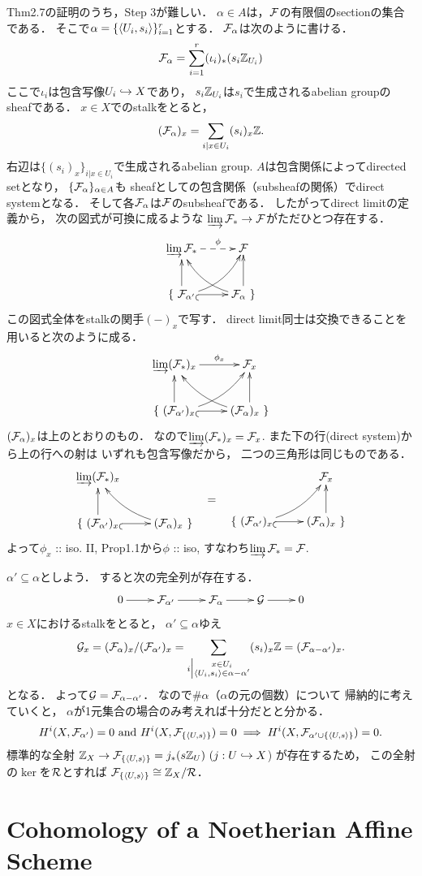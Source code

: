 \documentclass[]{jsarticle}
\begin{document}
Thm2.7の証明のうち，Step $3$が難しい．
$\alpha \in A$は，$\mathcal{F}$の有限個のsectionの集合である．
そこで$\alpha=\{ \langle U_i,s_i \rangle \}_{i=1}^r$とする．
$\mathcal{F}_{\alpha}$は次のように書ける．
\[ \mathcal{F}_{\alpha}=\sum_{i=1}^r (\iota_i)_* (s_i\mathbb{Z}_{U_i}) \]
ここで$\iota_i$は包含写像$U_i \hookrightarrow X$であり，
$s_i\mathbb{Z}_{U_i}$は$s_i$で生成されるabelian groupのsheafである．
$x \in X$でのstalkをとると，
\[ (\mathcal{F}_{\alpha})_x=\sum_{i | x \in U_i} (s_i)_x \mathbb{Z}. \]
右辺は$\{ (s_i)_x \}_{i | x \in U_i}$で生成されるabelian group.
$A$は包含関係によってdirected setとなり，
$\{ \mathcal{F}_{\alpha} \}_{\alpha \in A}$も
sheafとしての包含関係（subsheafの関係）でdirect systemとなる．
そして各$\mathcal{F}_{\alpha}$は$\mathcal{F}$のsubsheafである．
したがってdirect limitの定義から，
次の図式が可換に成るような
$\varinjlim \mathcal{F}_* \to \mathcal{F}$がただひとつ存在する．
\[
\xymatrix
{
    \varinjlim \shF_* \ar@{-->}[r]^-{\phi}& \shF \\
    \{\ \shF_{\alpha'} \ar@{_(->}[r] \ar[u]\ar@/_10pt/[ru]& \shF_{\alpha} \ar@/^10pt/[lu]\ar[u] \ \}
}
\]
この図式全体をstalkの関手$(-)_x$で写す．
direct limit同士は交換できることを用いると次のように成る．
\[
\xymatrix
{
    \varinjlim (\shF_*)_x \ar[r]^-{\phi_x}& \shF_x \\
    \{\ (\shF_{\alpha'})_x \ar@{_(->}[r] \ar[u]\ar@/_10pt/[ru]& (\shF_{\alpha})_x \ar@/^10pt/[lu]\ar[u] \ \}
}
\]
$(\mathcal{F}_{\alpha})_x$は上のとおりのもの．
なので$\varinjlim (\mathcal{F}_*)_x=\mathcal{F}_x$.
また下の行(direct system)から上の行への射は
いずれも包含写像だから，
二つの三角形は同じものである．
\[
\xymatrix
{
    \varinjlim (\shF_*)_x & {} \\
    \{\ (\shF_{\alpha'})_x \ar@{_(->}[r] \ar[u]& (\shF_{\alpha})_x \ar@/^10pt/[lu] \ \}
}
\quad \raisebox{-20pt}{=} \quad 
\xymatrix
{
    {} & \shF_x \\
    \{\ (\shF_{\alpha'})_x \ar@{_(->}[r] \ar@/_10pt/[ru]& (\shF_{\alpha})_x \ar[u] \ \}
}
\]
よって$\phi_x$ :: iso.
II, Prop1.1から$\phi$ :: iso, すなわち$\varinjlim \mathcal{F}_*=\mathcal{F}$.

$\alpha' \subseteq \alpha$としよう．
すると次の完全列が存在する．
\[\xymatrix{ 0 \ar[r]& \shF_{\alpha'} \ar[r]& \shF_{\alpha} \ar[r]& \shG \ar[r]& 0 }\]
$x \in X$におけるstalkをとると，
$\alpha' \subseteq \alpha$ゆえ
\[
    \mathcal{G}_x
    =(\mathcal{F}_{\alpha})_x/(\mathcal{F}_{\alpha'})_x
    =\sum_{i \Big| \substack{x \in U_i \\ \langle U_i,s_i \rangle \in \alpha-\alpha'}} (s_i)_x \mathbb{Z}
    =(\mathcal{F}_{\alpha-\alpha'})_x.
\]
となる．
よって$\mathcal{G}=\mathcal{F}_{\alpha-\alpha'}$．
なので$\#\alpha$（$\alpha$の元の個数）について
帰納的に考えていくと，
$\alpha$が1元集合の場合のみ考えれば十分だとと分かる．
\[
    H^i(X, \mathcal{F}_{\alpha'})=0 \text{ and } H^i(X, \mathcal{F}_{\{\langle U,s \rangle\}})=0
    \implies
    H^i(X, \mathcal{F}_{\alpha' \cup \{\langle U,s \rangle\}})=0.
\]
標準的な全射
$\Z_X \to \shF_{\{\sect{U}{s}\}}=j_*(s \Z_U) \ (j: U \inclmap X$)
が存在するため，
この全射の$\ker$を$\mathcal{R}$とすれば
$\mathcal{F}_{\{\langle U,s \rangle\}} \cong \mathbb{Z}_X/\mathcal{R}$．

\section{Cohomology of a Noetherian Affine Scheme}
\end{document}
